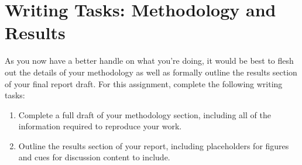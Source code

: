 \documentclass[11pt]{article}
\begin{document}

\section{Writing Tasks: Methodology and Results}

As you now have a better handle on what you're doing, it would be best to flesh out the details of your methodology as well as formally outline the results section of your final report draft.
For this assignment, complete the following writing tasks:

\begin{enumerate}[label=\alph*.]
	\item Complete a full draft of your methodology section, including all of the information required to reproduce your work.  
	\item Outline the results section of your report, including placeholders for figures and cues for discussion content to include.
\end{enumerate}
	
	
\end{document}
